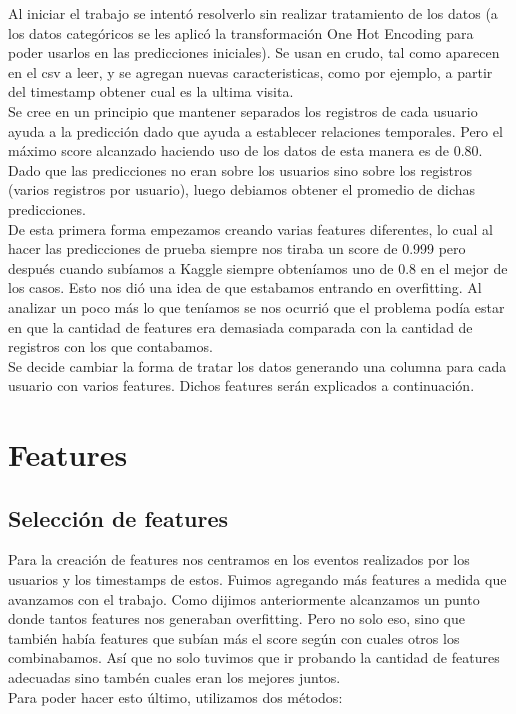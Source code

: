 \documentclass[a4paper]{article}
\begin{document}
    Al iniciar el trabajo se intentó resolverlo sin realizar tratamiento de los datos (a los datos categóricos se les aplicó la transformación One Hot Encoding para poder usarlos en las predicciones iniciales). Se usan en crudo, tal como aparecen en el csv a leer, y se agregan nuevas caracteristicas, como por ejemplo, a partir del timestamp obtener cual es la ultima visita.\\
    Se cree en un principio que mantener separados los registros de cada usuario ayuda a la predicción dado que ayuda a establecer relaciones temporales. Pero el máximo score alcanzado haciendo uso de los datos de esta manera es de 0.80. 
    Dado que las predicciones no eran sobre los usuarios sino sobre los registros (varios registros por usuario), luego debiamos obtener el promedio de dichas predicciones.\\
    De esta primera forma empezamos creando varias features diferentes, lo cual al hacer las predicciones de prueba siempre nos tiraba un score de 0.999 pero después cuando subíamos a Kaggle siempre obteníamos uno de 0.8 en el mejor de los casos. Esto nos dió una idea de que estabamos entrando en overfitting. Al analizar un poco más lo que teníamos se nos ocurrió que el problema podía estar en que la cantidad de features era demasiada comparada con la cantidad de registros con los que contabamos.\\
    
    Se decide cambiar la forma de tratar los datos generando una columna para cada usuario con varios features. Dichos features serán explicados a continuación.\\

\section{Features}\label{sec:features}

    \subsection{Selección de features}\label{subsec:seleccion features}

        Para la creación de features nos centramos en los eventos realizados por los usuarios y los timestamps de estos.
        Fuimos agregando más features a medida que avanzamos con el trabajo. Como dijimos anteriormente alcanzamos un punto donde tantos features nos generaban overfitting. Pero no solo eso, sino que también había features que subían más el score según con cuales otros los combinabamos. Así que no solo tuvimos que ir probando la cantidad de features adecuadas sino tambén cuales eran los mejores juntos.\\
        Para poder hacer esto último, utilizamos dos métodos:\\
        
\end{document}
